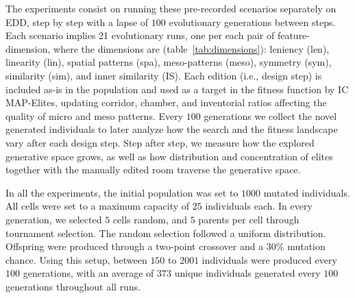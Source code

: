 

The experiments consist on running these pre-recorded scenarios separately on EDD, step by step with a lapse of $100$ evolutionary generations between steps. Each scenario implies 21 evolutionary runs, one per each pair of feature-dimension, where the dimensions are (table~\ref{tab:dimensions}): leniency (len), linearity (lin), spatial patterns (spa), meso-patterns (meso), symmetry (sym), similarity (sim), and inner similarity (IS). Each edition (i.e., design step) is included as-is in the population and used as a target in the fitness function by IC MAP-Elites, updating corridor, chamber, and inventorial ratios affecting the quality of micro and meso patterns. Every $100$ generations we collect the novel generated individuals to later analyze how the search and the fitness landscape vary after each design step. Step after step, we measure how the explored generative space grows, as well as how distribution and concentration of elites together with the manually edited room traverse the generative space.%



In all the experiments, the initial population was set to $1000$ mutated individuals. All cells were set to a maximum capacity of $25$ individuals each. In every generation, we selected $5$ cells random, and $5$ parents per cell through tournament selection. The random selection followed a uniform distribution. Offspring were produced through a two-point crossover and a $30$\% mutation chance. Using this setup, between $150$ to $2001$ individuals were produced every $100$ generations, with an average of $373$ unique individuals generated every $100$ generations throughout all runs.


